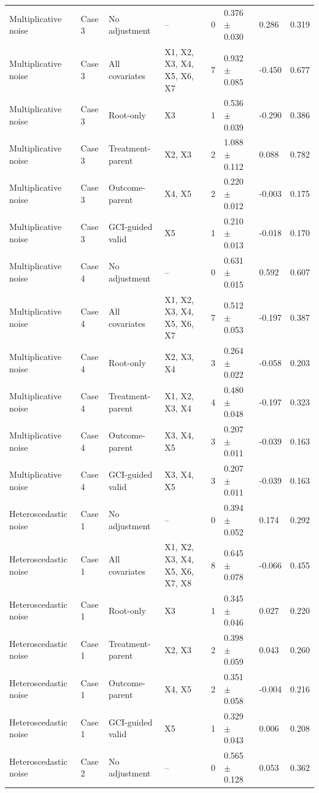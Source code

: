 \begin{tabular}{llllrlll}
Multiplicative noise & Case 3 & No adjustment & -- & 0 & 0.376 $\pm$ 0.030 & 0.286 & 0.319 \\
Multiplicative noise & Case 3 & All covariates & X1, X2, X3, X4, X5, X6, X7 & 7 & 0.932 $\pm$ 0.085 & -0.450 & 0.677 \\
Multiplicative noise & Case 3 & Root-only & X3 & 1 & 0.536 $\pm$ 0.039 & -0.290 & 0.386 \\
Multiplicative noise & Case 3 & Treatment-parent & X2, X3 & 2 & 1.088 $\pm$ 0.112 & 0.088 & 0.782 \\
Multiplicative noise & Case 3 & Outcome-parent & X4, X5 & 2 & 0.220 $\pm$ 0.012 & -0.003 & 0.175 \\
Multiplicative noise & Case 3 & GCI-guided valid & X5 & 1 & 0.210 $\pm$ 0.013 & -0.018 & 0.170 \\
Multiplicative noise & Case 4 & No adjustment & -- & 0 & 0.631 $\pm$ 0.015 & 0.592 & 0.607 \\
Multiplicative noise & Case 4 & All covariates & X1, X2, X3, X4, X5, X6, X7 & 7 & 0.512 $\pm$ 0.053 & -0.197 & 0.387 \\
Multiplicative noise & Case 4 & Root-only & X2, X3, X4 & 3 & 0.264 $\pm$ 0.022 & -0.058 & 0.203 \\
Multiplicative noise & Case 4 & Treatment-parent & X1, X2, X3, X4 & 4 & 0.480 $\pm$ 0.048 & -0.197 & 0.323 \\
Multiplicative noise & Case 4 & Outcome-parent & X3, X4, X5 & 3 & 0.207 $\pm$ 0.011 & -0.039 & 0.163 \\
Multiplicative noise & Case 4 & GCI-guided valid & X3, X4, X5 & 3 & 0.207 $\pm$ 0.011 & -0.039 & 0.163 \\
Heteroscedastic noise & Case 1 & No adjustment & -- & 0 & 0.394 $\pm$ 0.052 & 0.174 & 0.292 \\
Heteroscedastic noise & Case 1 & All covariates & X1, X2, X3, X4, X5, X6, X7, X8 & 8 & 0.645 $\pm$ 0.078 & -0.066 & 0.455 \\
Heteroscedastic noise & Case 1 & Root-only & X3 & 1 & 0.345 $\pm$ 0.046 & 0.027 & 0.220 \\
Heteroscedastic noise & Case 1 & Treatment-parent & X2, X3 & 2 & 0.398 $\pm$ 0.059 & 0.043 & 0.260 \\
Heteroscedastic noise & Case 1 & Outcome-parent & X4, X5 & 2 & 0.351 $\pm$ 0.058 & -0.004 & 0.216 \\
Heteroscedastic noise & Case 1 & GCI-guided valid & X5 & 1 & 0.329 $\pm$ 0.043 & 0.006 & 0.208 \\
Heteroscedastic noise & Case 2 & No adjustment & -- & 0 & 0.565 $\pm$ 0.128 & 0.053 & 0.362 \\

\end{tabular}
